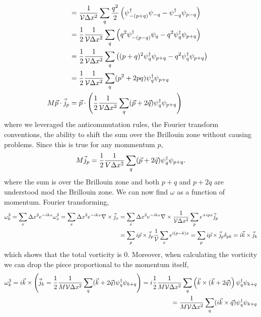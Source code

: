 \begin{align}
\nonumber\\
	&=
	\frac{1}{\mathcal{V} \Delta x^2}\sum_{q} \frac{q^2}{2} \left(\psi{}^{\dagger}_{-(p+q)} \psi_{-q} - \psi{}^{\dagger}_{-q} \psi_{p-q} \right)
\nonumber\\
	&=
	\frac{1}{2} \frac{1}{\mathcal{V} \Delta x^2}\sum_{q} \left(q^2\psi{}^{\dagger}_{-(p-q)} \psi_q - q^2 \psi{}^{\dagger}_{q} \psi_{p+q} \right)
\nonumber\\
	&=
	\frac{1}{2} \frac{1}{\mathcal{V} \Delta x^2}\sum_{q} \left((p+q)^2\psi{}^{\dagger}_{q} \psi_{p+q} - q^2 \psi{}^{\dagger}_{q} \psi_{p+q} \right)
\nonumber\\
	&=
	\frac{1}{2} \frac{1}{\mathcal{V} \Delta x^2}\sum_{q} (p^2 + 2pq)\psi{}^{\dagger}_{q} \psi_{p+q}
\nonumber\\
	M \vec{p} \cdot \vec{j}_p
	&=
	\vec{p} \cdot \left(\frac{1}{2} \frac{1}{\mathcal{V} \Delta x^2} \sum_q (\vec{p}+2\vec{q}) \psi{}^{\dagger}_q\psi_{p+q}\right)
\end{align}
where we leveraged the anticommutation rules, the Fourier transform conventions, the ability to shift the sum over the Brillouin zone without causing problems.
Since this is true for any mommentum $p$,
\begin{align}
	M \vec{j}_p = \frac{1}{2}\frac{1}{V\Delta x^2} \sum_q (\vec{p}+2\vec{q}) \psi{}^{\dagger}_{q} \psi_{p+q}.
\end{align}
where the sum is over the Brillouin zone and both $p+q$ and $p+2q$ are understood mod the Brillouin zone.
We can now find $\omega$ as a function of momentum.
Fourier transforming,
\begin{align}
	\omega^3_k
	= \sum_x \Delta x^2 e^{-ikx} \omega^3_x
	= \sum_x \Delta x^2 e^{-ikx} \nabla \times \vec{j}_x
	&= \sum_x \Delta x^2 e^{-ikx} \nabla \times \frac{1}{\mathcal{V} \Delta x^2} \sum_p e^{+ipx} \vec{j}_p
\nonumber\\
	&= \sum_p i\vec{p} \times \vec{j}_p \frac{1}{\mathcal{V}} \sum_x e^{i(p-k)x}
	= \sum_p i\vec{p} \times \vec{j}_p \delta_{pk}
	= i \vec{k} \times \vec{j}_k
\end{align}
which shows that the total vorticity is 0.
Moreover, when calculating the vorticity we can drop the piece proportional to the momentum itself,
\begin{align}
	\omega^3_k
	= i \vec{k} \times \left(\vec{j}_k = \frac{1}{2}\frac{1}{M \mathcal{V}\Delta x^2} \sum_q (\vec{k}+2\vec{q}) \psi{}^{\dagger}_{q} \psi_{k+q}\right)
	= i \frac{1}{2}\frac{1}{M \mathcal{V}\Delta x^2} \sum_q \left(\vec{k} \times (\vec{k}+2\vec{q})\right) \psi{}^{\dagger}_{q} \psi_{k+q}
\nonumber\\
	= \frac{1}{M \mathcal{V}\Delta x^2} \sum_q (i\vec{k} \times \vec{q}) \psi{}^{\dagger}_{q} \psi_{k+q}
\end{align}

